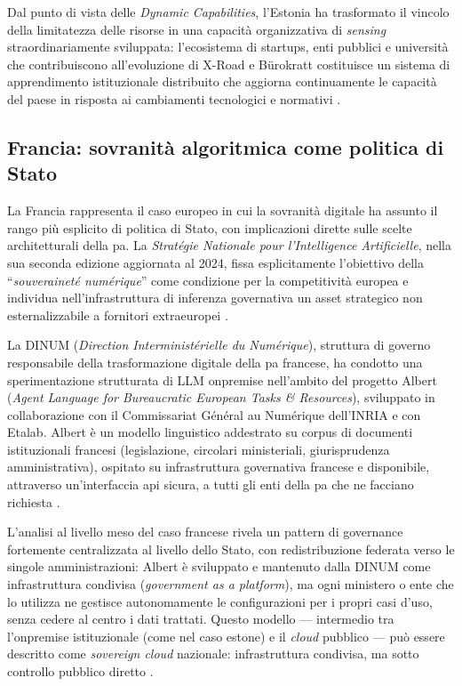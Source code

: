 Dal punto di vista delle \textit{Dynamic Capabilities}, l'Estonia ha trasformato
il vincolo della limitatezza delle risorse in una capacità organizzativa di
\textit{sensing} straordinariamente sviluppata: l'ecosistema di startups, enti
pubblici e università che contribuiscono all'evoluzione di X-Road e Bürokratt
costituisce un sistema di apprendimento istituzionale distribuito che aggiorna
continuamente le capacità del paese in risposta ai cambiamenti tecnologici
e normativi \parencite{Teece2007}.

\subsection{Francia: sovranità algoritmica come politica di Stato}

La Francia rappresenta il caso europeo in cui la sovranità digitale ha assunto
il rango più esplicito di politica di Stato, con implicazioni dirette
sulle scelte architetturali della \gls{pa}. La \textit{Stratégie Nationale pour
l'Intelligence Artificielle}, nella sua seconda edizione aggiornata al 2024,
fissa esplicitamente l'obiettivo della ``\textit{souveraineté numérique}'' come
condizione per la competitività europea e individua nell'infrastruttura di inferenza
governativa un asset strategico non esternalizzabile a fornitori extraeuropei
\parencite{EUParl_TechSovereignty2025}.

La DINUM (\textit{Direction Interministérielle du Numérique}), struttura di governo
responsabile della trasformazione digitale della \gls{pa} francese, ha condotto una
sperimentazione strutturata di LLM \gls{onpremise} nell'ambito del progetto
Albert (\textit{Agent Language for Bureaucratic European Tasks \& Resources}),
sviluppato in collaborazione con il Commissariat Général au Numérique dell'INRIA
e con Etalab. Albert è un modello linguistico addestrato su corpus di documenti
istituzionali francesi (legislazione, circolari ministeriali, giurisprudenza
amministrativa), ospitato su infrastruttura governativa francese e disponibile,
attraverso un'interfaccia \gls{api} sicura, a tutti gli enti della \gls{pa} che ne facciano
richiesta \parencite{OECDAIChapter2025}.

L'analisi al livello meso del caso francese rivela un pattern di governance
fortemente centralizzata al livello dello Stato, con redistribuzione
federata verso le singole amministrazioni: Albert è sviluppato e mantenuto dalla
DINUM come infrastruttura condivisa (\textit{government as a platform}), ma
ogni ministero o ente che lo utilizza ne gestisce autonomamente le configurazioni
per i propri casi d'uso, senza cedere al centro i dati trattati. Questo modello
--- intermedio tra l'\gls{onpremise} istituzionale (come nel caso estone) e
il \textit{cloud} pubblico --- può essere descritto come \textit{sovereign
cloud} nazionale: infrastruttura condivisa, ma sotto controllo pubblico diretto
\parencite{Gartner_SovereignCloud2026}.

